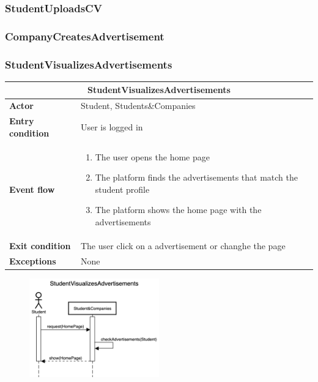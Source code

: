 \subsubsection{StudentUploadsCV}

\subsubsection{CompanyCreatesAdvertisement}

\subsubsection{StudentVisualizesAdvertisements}

\begin{table}[H]
    \centering
    \begin{tabular}{|l|m{10cm}|}
        \hline \multicolumn{2}{|c|}{\textbf{StudentVisualizesAdvertisements}} \\
        \hline \textbf{Actor} & Student, Students\&Companies \\
        \hline \textbf{Entry condition} & User is logged in \\
        \hline \textbf{Event flow} &
        \begin{enumerate}
            \item The user opens the home page
            \item The platform finds the advertisements that match the student profile
            \item The platform shows the home page with the advertisements
        \end{enumerate}
        \\
        \hline \textbf{Exit condition} & The user click on a advertisement or changhe the page \\
        \hline \textbf{Exceptions} & None \\
        \hline
    \end{tabular}
\end{table}

\begin{figure}[H]
    \centering
    \includegraphics[width=0.5\textwidth]{../../assets/sequence-diagrams/StudentVisualizesAdvertisements.png}
\end{figure}




